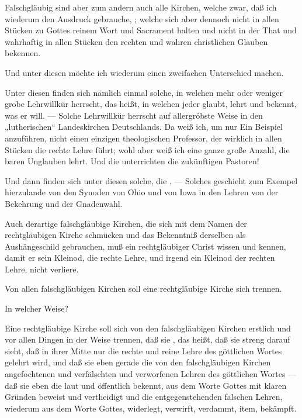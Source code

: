 Falschgläubig sind aber zum andern auch alle Kirchen, welche zwar, daß ich wiederum den Ausdruck gebrauche, ; welche sich aber dennoch nicht in allen Stücken zu Gottes reinem Wort und Sacrament halten und nicht in der That und wahrhaftig in allen Stücken den rechten und wahren christlichen Glauben bekennen.

Und unter diesen möchte ich wiederum einen zweifachen Unterschied machen.

Unter diesen finden sich nämlich einmal solche, in welchen mehr oder weniger grobe Lehrwillkür herrscht, das heißt, in welchen jeder glaubt, lehrt und bekennt, was er will. — Solche Lehrwillkür herrscht auf allergröbste Weise in den „lutherischen“ Landeskirchen Deutschlands. Da weiß ich, um nur Ein Beispiel anzuführen, nicht einen einzigen theologischen Professor, der wirklich in allen Stücken die rechte Lehre führt; wohl aber weiß ich eine ganze große Anzahl, die baren Unglauben lehrt. Und die unterrichten die zukünftigen Pastoren!

Und dann finden sich unter diesen solche, die . — Solches geschieht zum Exempel hierzulande von den Synoden von Ohio und von Iowa in den Lehren von der Bekehrung und der Gnadenwahl.

Auch derartige falschgläubige Kirchen, die sich mit dem Namen der rechtgläubigen Kirche schmücken und das Bekenntniß derselben als Aushängeschild gebrauchen, muß ein rechtgläubiger Christ wissen und kennen, damit er sein Kleinod, die rechte Lehre, und irgend ein Kleinod der rechten Lehre, nicht verliere.

Von allen falschgläubigen Kirchen soll eine rechtgläubige Kirche sich trennen.

In welcher Weise?

Eine rechtgläubige Kirche soll sich von den falschgläubigen Kirchen erstlich und vor allen Dingen in der Weise trennen, daß sie , das heißt, daß sie streng darauf sieht, daß in ihrer Mitte nur die rechte und reine Lehre des göttlichen Wortes gelehrt wird, und daß sie eben gerade die von den falschgläubigen Kirchen angefochtenen und verfälschten und verworfenen Lehren des göttlichen Wortes — daß sie eben die laut und öffentlich bekennt, aus dem Worte Gottes mit klaren Gründen beweist und vertheidigt und die entgegenstehenden falschen Lehren, wiederum aus dem Worte Gottes, widerlegt, verwirft, verdammt, item, bekämpft.

